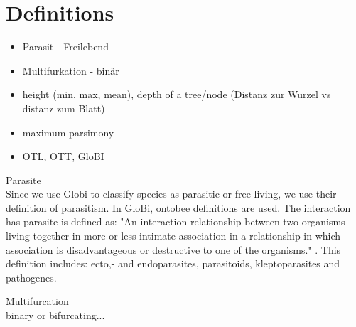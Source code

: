   \section{Definitions}
    \begin{itemize}
      \item Parasit - Freilebend
      \item Multifurkation - binär
      \item height (min, max, mean), depth of a tree/node (Distanz zur Wurzel vs distanz zum Blatt)
      \item maximum parsimony
      \item OTL, OTT, GloBI
    \end{itemize}

    Parasite \\
    Since we use Globi to classify species as parasitic or free-living, we use their definition of 
      parasitism. In GloBi, ontobee definitions are used.
    The interaction has parasite is defined as: "An interaction relationship between two organisms 
      living together in more or less intimate association in a relationship in which association is 
      disadvantageous or destructive to one of the organisms." \cite{...}. This definition includes: ecto,-
    and endoparasites, parasitoids, kleptoparasites and pathogenes.


    Multifurcation \\
    binary or bifurcating... \cite{Felsenstein2003}

